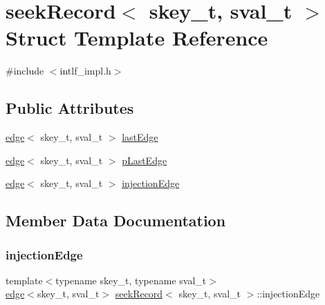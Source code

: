 \hypertarget{structseekRecord}{}\section{seek\+Record$<$ skey\+\_\+t, sval\+\_\+t $>$ Struct Template Reference}
\label{structseekRecord}


{\ttfamily \#include $<$intlf\+\_\+impl.\+h$>$}

\subsection*{Public Attributes}
\begin{DoxyCompactItemize}
\item 
\hyperlink{structedge}{edge}$<$ skey\+\_\+t, sval\+\_\+t $>$ \hyperlink{structseekRecord_a0579f5461aef7097ab39f272b9bd110f}{last\+Edge}
\item 
\hyperlink{structedge}{edge}$<$ skey\+\_\+t, sval\+\_\+t $>$ \hyperlink{structseekRecord_a67108aa1c693e09220663af93803f591}{p\+Last\+Edge}
\item 
\hyperlink{structedge}{edge}$<$ skey\+\_\+t, sval\+\_\+t $>$ \hyperlink{structseekRecord_a5d32c8dd7b5e64af72649a8b08cf871a}{injection\+Edge}
\end{DoxyCompactItemize}


\subsection{Member Data Documentation}
\mbox{\label{structseekRecord_a5d32c8dd7b5e64af72649a8b08cf871a}} 
\subsubsection{\texorpdfstring{injection\+Edge}{injectionEdge}}
{\footnotesize\ttfamily template$<$typename skey\+\_\+t, typename sval\+\_\+t$>$ \\
\hyperlink{structedge}{edge}$<$skey\+\_\+t, sval\+\_\+t$>$ \hyperlink{structseekRecord}{seek\+Record}$<$ skey\+\_\+t, sval\+\_\+t $>$\+::injection\+Edge}

\mbox{\label{structseekRecord_a0579f5461aef7097ab39f272b9bd110f}} 
